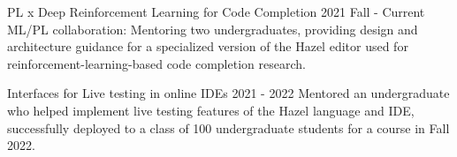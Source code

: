 \documentclass[10pt,a4paper]{article}
\begin{document}

  \headedsubsection
    {PL x Deep Reinforcement Learning for Code Completion}
    {2021 Fall - Current}
    {ML/PL collaboration: Mentoring two undergraduates, providing design and architecture guidance for a specialized version of the Hazel editor used for reinforcement-learning-based code completion research.}
  
  \headedsubsection
    {Interfaces for Live testing in online IDEs}
    {2021 - 2022}
    {Mentored an undergraduate who helped implement live testing features of the Hazel language and IDE, successfully deployed to a class of 100 undergraduate students for a course in Fall 2022.}
 
\end{document}

